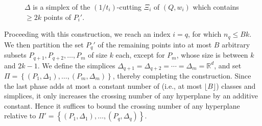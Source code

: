 \documentclass[11pt]{article}
\def\reals{\mathbb R}
\begin{document}
\begin{figure}[htb]
    \begin{center}
        \caption{$\Delta$ is a simplex of the $(1/t_{i})$-cutting $\Xi_{i}$ of $(Q,w_{i})$ which contains $\geq 2k$ points of $P_{i}'$.}
        \label{fig_partition1}
    \end{center}
\end{figure}

Proceeding with this construction, we reach an index $i = q$, for which $n_{q} \leq Bk$. We then partition the set $P_{q}'$ of the remaining points into at most $B$ arbitrary subsets $P_{q+1}, P_{q+2}, \ldots, P_{m}$ of size $k$ each, except for $P_{m}$, whose size is between $k$ and $2k - 1$. We define the simplices $\Delta_{q+1} = \Delta_{q+2} = \cdots = \Delta_{m} = \reals^{d}$, and set $\Pi = \left\{(P_{1}, \Delta_{1}), \ldots, (P_{m}, \Delta_{m})\right\}$, thereby completing the construction. Since the last phase adds at most a constant number of (i.e., at most $\lfloor B \rfloor$) classes and simplices, it only increases the crossing number of any hyperplane by an additive constant. Hence it suffices to bound the crossing number of any hyperplane relative to $\Pi' = \left\{(P_{1}, \Delta_{1}), \ldots, (P_{q}, \Delta_{q})\right\}$.
\end{document}
